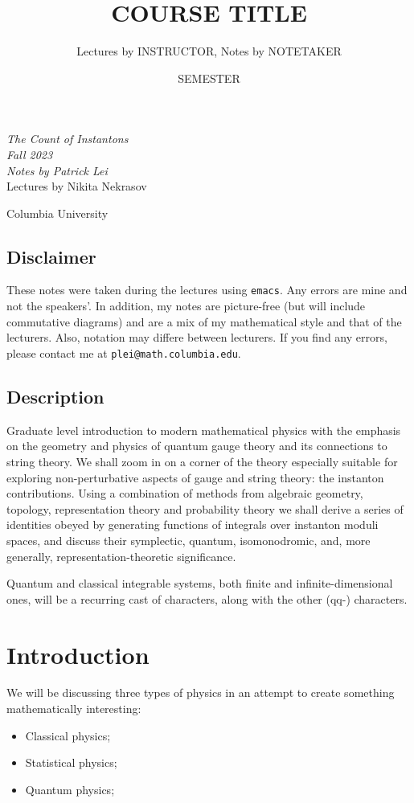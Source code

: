 \documentclass[leqno, openany]{memoir}
\title{COURSE TITLE}
\author{Lectures by INSTRUCTOR, Notes by NOTETAKER}
\date{SEMESTER}
\theoremstyle{definition}
\theoremstyle{remark}
\theoremstyle{plain}
\theoremstyle{definition}
\theoremstyle{remark}
\newcommand*{\titleSW}
    {\begingroup%
    \raggedleft
    \vspace*{\baselineskip}
    {\Huge\itshape The Count of Instantons \\ Fall 2023}\\[\baselineskip]
    {\large\itshape Notes by Patrick Lei}\\[0.2\textheight]
    {\Large Lectures by Nikita Nekrasov}\par
    \vfill
    {\Large \sffamily Columbia University}
    \vspace*{\baselineskip}
\endgroup}
\begin{document}
    
\begin{titlingpage}
\titleSW
\end{titlingpage}

\thispagestyle{empty}
\section*{Disclaimer}%
\label{sec:disclaimer}

These notes were taken during the lectures using \texttt{emacs}. 
Any errors are mine and not the speakers'. 
In addition, my notes are picture-free (but will include commutative diagrams) and are a mix of my mathematical style and that of the lecturers. Also, notation may differe between lecturers.
If you find any errors, please contact me at \texttt{plei@math.columbia.edu}.

\section*{Description}

Graduate level introduction to modern mathematical physics with the emphasis on the geometry and physics of quantum gauge theory and its connections to string theory.  We shall zoom in on a corner of the theory especially suitable for exploring non-perturbative aspects of gauge and string theory: the instanton contributions. Using a combination of methods from algebraic geometry, topology, representation theory and probability theory we shall derive a series of identities obeyed by generating functions of integrals over instanton moduli spaces, and discuss their symplectic, quantum, isomonodromic, and, more generally, representation-theoretic significance.

Quantum and classical integrable systems, both finite and infinite-dimensional ones, will be a recurring cast of characters, along with the other (qq-) characters.


\newpage

\tableofcontents

\chapter{Introduction}
\label{cha:intro}

We will be discussing three types of physics in an attempt to create something mathematically interesting:
\begin{itemize}
\item Classical physics;
\item Statistical physics;
\item Quantum physics;
\end{itemize}
\end{document}
